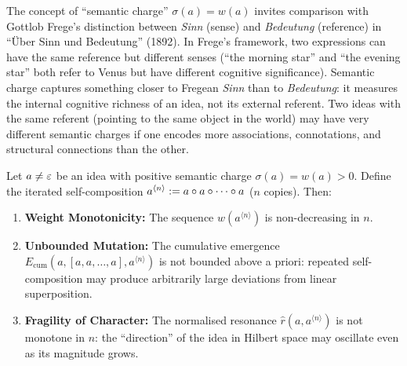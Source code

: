 \begin{remark}
\label{rem:ch9:semantic_charge_frege}
The concept of ``semantic charge'' $\sigma(a) = w(a)$ invites comparison with
Gottlob Frege's distinction between \emph{Sinn} (sense) and \emph{Bedeutung}
(reference) in ``\"Uber Sinn und Bedeutung'' (1892).  In Frege's framework,
two expressions can have the same reference but different senses (``the
morning star'' and ``the evening star'' both refer to Venus but have
different cognitive significance).  Semantic charge captures something closer
to Fregean \emph{Sinn} than to \emph{Bedeutung}: it measures the internal
cognitive richness of an idea, not its external referent.  Two ideas with
the same referent (pointing to the same object in the world) may have very
different semantic charges if one encodes more associations, connotations,
and structural connections than the other.
\end{remark}



\begin{theorem}
\label{thm:sublime-fragility}
Let $a \neq \varepsilon$ be an idea with positive semantic charge
$\sigma(a) = w(a) > 0$.  Define the iterated self-composition
$a^{\langle n \rangle} := a \circ a \circ \cdots \circ a$
($n$ copies).  Then:
\begin{enumerate}
\item \textbf{Weight Monotonicity:} The sequence $w(a^{\langle n \rangle})$
  is non-decreasing in $n$.
\item \textbf{Unbounded Mutation:} The cumulative emergence
  $E_{\mathrm{cum}}(a, [a, a, \ldots, a], a^{\langle n \rangle})$
  is not bounded above a priori: repeated self-composition may produce
  arbitrarily large deviations from linear superposition.
\item \textbf{Fragility of Character:} The normalised resonance
  $\hat{r}(a, a^{\langle n \rangle})$ is not monotone in $n$: the
  ``direction'' of the idea in Hilbert space may oscillate even as
  its magnitude grows.
\end{enumerate}
\end{theorem}

